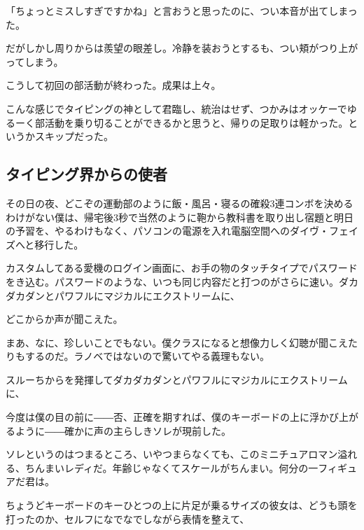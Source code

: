 
「ちょっとミスしすぎですかね」と言おうと思ったのに、つい本音が出てしまった。

だがしかし周りからは羨望の眼差し。冷静を装おうとするも、つい頬がつり上がってしまう。



こうして初回の部活動が終わった。成果は上々。

こんな感じでタイピングの神として君臨し、統治はせず、つかみはオッケーでゆるーく部活動を乗り切ることができるかと思うと、帰りの足取りは軽かった。というかスキップだった。

\subsection{タイピング界からの使者}

その日の夜、どこぞの運動部のように飯・風呂・寝るの確殺3連コンボを決めるわけがない僕は、帰宅後3秒で当然のように鞄から教科書を取り出し宿題と明日の予習を、やるわけもなく、パソコンの電源を入れ電脳空間へのダイヴ・フェイズへと移行した。

カスタムしてある愛機のログイン画面に、お手の物のタッチタイプでパスワードをき込む。パスワードのような、いつも同じ内容だと打つのがさらに速い。ダカダカダンとパワフルにマジカルにエクストリームに、


どこからか声が聞こえた。

まあ、なに、珍しいことでもない。僕クラスになると想像力しく幻聴が聞こえたりもするのだ。ラノベではないので驚いてやる義理もない。

スルーちからを発揮してダカダカダンとパワフルにマジカルにエクストリームに、


今度は僕の目の前に――否、正確を期すれば、僕のキーボードの上に浮かび上がるように――確かに声の主らしきソレが現前した。

ソレというのはつまるところ、いやつまらなくても、このミニチュアロマン溢れる、ちんまいレディだ。年齢じゃなくてスケールがちんまい。何分の一フィギュアだ君は。

ちょうどキーボードのキーひとつの上に片足が乗るサイズの彼女は、どうも頭を打ったのか、セルフになでなでしながら表情を整えて、

